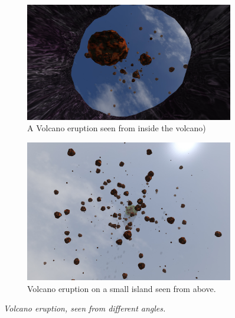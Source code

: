 \newpage
\begin{figure}[H]
\begin{subfigure}{\textwidth}
  \centering
  \includegraphics[width=0.9\linewidth]{images/Volcano1.jpg}
  \caption{A Volcano eruption seen from inside the volcano)}
  \label{fig:volcanoEruption1}
\end{subfigure}%

\begin{subfigure}{\textwidth}
  \centering
  \includegraphics[width=0.9\linewidth]{images/Volcano2.jpg}
  \caption{Volcano eruption on a small island seen from above.}
  \label{fig:volcanoEruption2}
\end{subfigure}
\caption[Noise comparison]{\textit{Volcano eruption, seen from different angles.}}
\label{fig:volcanoEruptions}
\end{figure}




